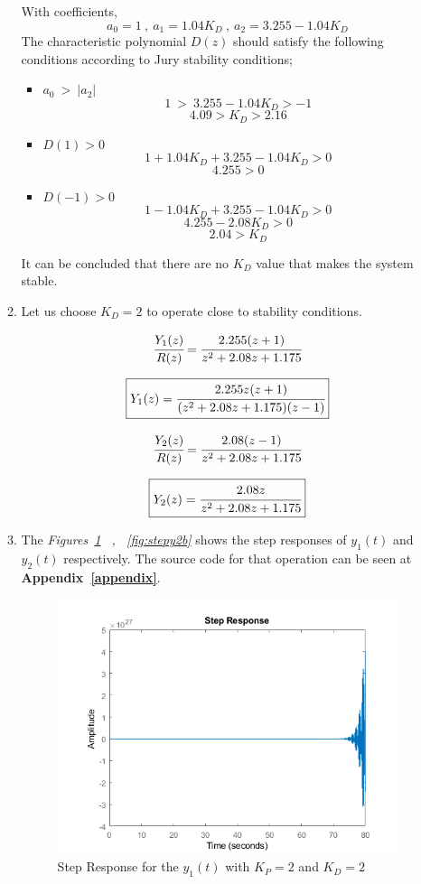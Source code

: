 \documentclass[a4paper,12pt]{article}
\begin{document}
\begin{enumerate}
\begin{enumerate}
			With coefficients, 
		$$ \boxed{a_0=1} \ , \ \boxed{a_1=1.04K_D} \ ,\ \boxed{a_2=3.255-1.04K_D} $$		
		The characteristic polynomial $D(z)$ should satisfy the following conditions according to Jury stability conditions;
		\begin{itemize}
			\item $a_0\ >\ |a_2| $ \\
			$$ 1\ >\ 3.255-1.04K_D > -1 $$
			$$\boxed{ 4.09 > K_D > 2.16 }$$
			\item $D(1)>0$ \\
			$$ 1+1.04K_D+3.255-1.04K_D > 0$$
			$$ \boxed{ 4.255>0} $$
			\item $D(-1)>0$ \\
			$$ 1-1.04K_D+3.255-1.04K_D > 0$$
			$$ 4.255-2.08K_D>0 $$
			$$\boxed{ 2.04>K_D }$$				
		\end{itemize}
		It can be concluded that there are no $K_D$ value that makes the system stable.
		
		
		\item Let us choose \textbf{$K_D=2$} to operate close to stability conditions.
		
			$$\cfrac{Y_1(z)}{R(z)} =\cfrac{2.255(z+1)}{z^2+2.08z+1.175}$$
			
			$$\boxed{ Y_1(z)= \cfrac{2.255z(z+1)}{(z^2+2.08z+1.175)(z-1)} }$$	
			
				
			$$ \cfrac{Y_2(z)}{R(z)} =\cfrac{2.08(z-1)}{z^2+2.08z+1.175}$$
			
			$$\boxed{ Y_2(z)= \cfrac{2.08z}{z^2+2.08z+1.175} }$$	
		
		
		\item The \textit{Figures\ \ref{fig:stepy1b} \ , \ \ref{fig:stepy2b}} shows the step responses of $y_1(t)$ and $y_2(t)$ respectively. The source code for that operation can be seen at \textbf{Appendix~\ref{appendix}}.
		 
		
		 
		  \begin{figure}[H]
		 	\center
		 	\setlength{\unitlength}{\textwidth} 
		 	\includegraphics[width=1.0\unitlength]{images/stepy1b}
		 	\caption{\label{fig:stepy1b} Step Response for the $y_1(t)$ with $K_P=2$ and $K_D=2$}
		 \end{figure}
	 	

\end{enumerate}
\end{enumerate}
\end{document}
